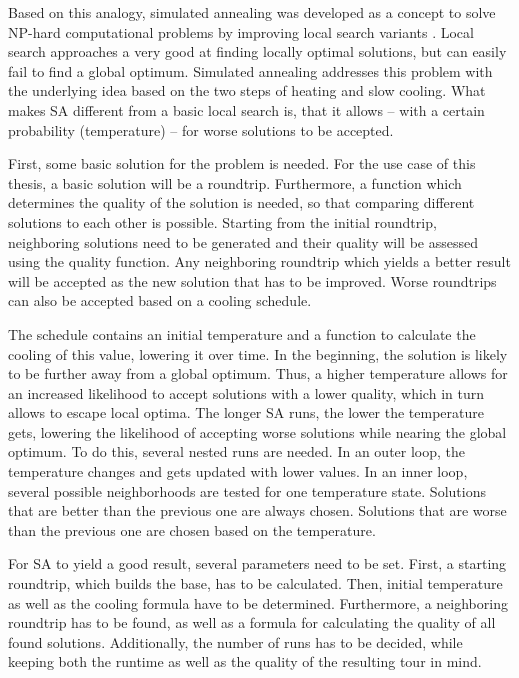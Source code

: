 Based on this analogy, simulated annealing was developed as a concept to solve NP-hard computational problems by improving local search variants \cite{aarts_simulated_2005, eglese_simulated_1990}.
Local search approaches a very good at finding locally optimal solutions, but can easily fail to find a global optimum.
Simulated annealing addresses this problem with the underlying idea based on the two steps of heating and slow cooling.
What makes SA different from a basic local search is, that it allows -- with a certain probability (temperature) -- for worse solutions to be accepted.

First, some basic solution for the problem is needed.
For the use case of this thesis, a basic solution will be a roundtrip.
Furthermore, a function which determines the quality of the solution is needed, so that comparing different solutions to each other is possible. 
Starting from the initial roundtrip, neighboring solutions need to be generated and their quality will be assessed using the quality function.
Any neighboring roundtrip which yields a better result will be accepted as the new solution that has to be improved.
Worse roundtrips can also be accepted based on a cooling schedule.

The schedule contains an initial temperature and a function to calculate the cooling of this value, lowering it over time.
In the beginning, the solution is likely to be further away from a global optimum.
Thus, a higher temperature allows for an increased likelihood to accept solutions with a lower quality, which in turn allows to escape local optima.
The longer SA runs, the lower the temperature gets, lowering the likelihood of accepting worse solutions while nearing the global optimum. 
To do this, several nested runs are needed.
In an outer loop, the temperature changes and gets updated with lower values.
In an inner loop, several possible neighborhoods are tested for one temperature state. 
Solutions that are better than the previous one are always chosen.
Solutions that are worse than the previous one are chosen based on the temperature.


For SA to yield a good result, several parameters need to be set. 
First, a starting roundtrip, which builds the base, has to be calculated.
Then, initial temperature as well as the cooling formula have to be determined.
Furthermore, a neighboring roundtrip has to be found, as well as a formula for calculating the quality of all found solutions.
Additionally, the number of runs has to be decided, while keeping both the runtime as well as the quality of the resulting tour in mind.

